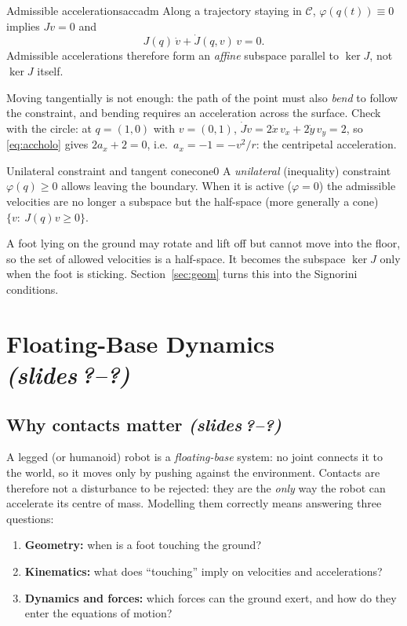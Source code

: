 \documentclass[11pt,a4paper]{article}
\newcommand{\sr}{\emph{(slides\,?--?)}}
\begin{document}
\begin{proposition}{Admissible accelerations}{accadm}
Along a trajectory staying in $\mathcal C$, $\varphi(q(t))\equiv0$ implies
$J v=0$ and
\begin{equation}\label{eq:accholo}
  J(q)\,\dot v+\dot J(q,v)\,v=0 .
\end{equation}
Admissible accelerations therefore form an \emph{affine} subspace parallel to $\ker J$,
not $\ker J$ itself.
\end{proposition}

\begin{intuition}
Moving tangentially is not enough: the path of the point must also \emph{bend} to follow
the constraint, and bending requires an acceleration across the surface. Check with the
circle: at $q=(1,0)$ with $v=(0,1)$, $\dot J v=2\dot x\,v_x+2\dot y\,v_y=2$, so
\eqref{eq:accholo} gives $2a_x+2=0$, i.e.\ $a_x=-1=-v^2/r$: the centripetal acceleration.
\end{intuition}

\begin{definition}{Unilateral constraint and tangent cone}{cone0}
A \emph{unilateral} (inequality) constraint $\varphi(q)\ge0$ allows leaving the boundary.
When it is active ($\varphi=0$) the admissible velocities are no longer a subspace but the
half-space (more generally a cone) $\{v:\ J(q)v\ge0\}$.
\end{definition}

\begin{intuition}
A foot lying on the ground may rotate and lift off but cannot move into the floor, so the
set of allowed velocities is a half-space. It becomes the subspace $\ker J$ only when the
foot is sticking. Section~\ref{sec:geom} turns this into the Signorini conditions.
\end{intuition}

\section{Floating-Base Dynamics \sr}\label{sec:fb}

\subsection*{Why contacts matter \sr}
A legged (or humanoid) robot is a \emph{floating-base} system: no joint connects it to the
world, so it moves only by pushing against the environment. Contacts are therefore not a
disturbance to be rejected: they are the \emph{only} way the robot can accelerate its
centre of mass. Modelling them correctly means answering three questions:
\begin{enumerate}[nosep]
  \item \textbf{Geometry:} when is a foot touching the ground?
  \item \textbf{Kinematics:} what does ``touching'' imply on velocities and accelerations?
  \item \textbf{Dynamics and forces:} which forces can the ground exert, and how do they enter the equations of motion?
\end{enumerate}
\end{document}
